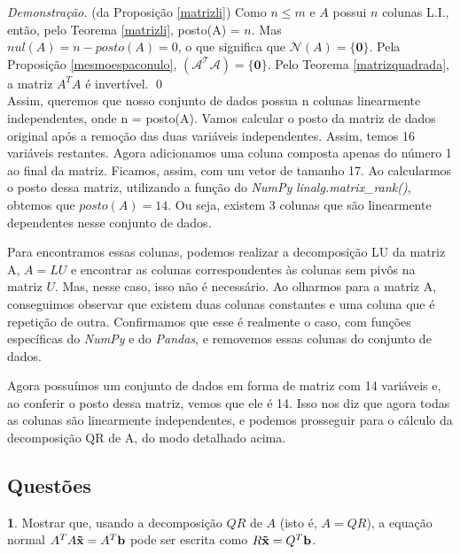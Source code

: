 \documentclass[a4paper, 12pt]{article}
\theoremstyle{definition}
\newtheorem{questao}{}
\newenvironment{demonstracao}{\noindent\textit{Demonstração.}}{\qed}
\theoremstyle{remark}
\begin{document}
\begin{demonstracao}{ (da Proposição \ref{matrizli})}
Como $n \leq m$ e $A$ possui $n$ colunas L.I., então, pelo Teorema \ref{matrizli}, posto(A) = $n$. Mas $nul(A) = n - posto(A) = 0$, o que significa que $\mathcal{N}(A) = \{\mathbf{0}\}$. Pela Proposição \ref{mesmoespaconulo}, $\mathcal{(A^TA)} = \{\mathbf{0}\}$. Pelo Teorema \ref{matrizquadrada}, a matriz $A^TA$ é invertível.
\end{demonstracao}\\

Assim, queremos que nosso conjunto de dados possua n colunas linearmente independentes, onde n = posto(A). Vamos calcular o posto da matriz de dados original após a remoção das duas variáveis independentes. Assim, temos 16 variáveis restantes. Agora adicionamos uma coluna composta apenas do número 1 ao final da matriz. Ficamos, assim, com um vetor de tamanho 17. Ao calcularmos o posto dessa matriz, utilizando a função do \textit{NumPy} \textit{linalg.matrix\_rank()}, obtemos que $posto(A) = 14$. Ou seja, existem 3 colunas que são linearmente dependentes nesse conjunto de dados.

Para encontramos essas colunas, podemos realizar a decomposição LU da matriz A, $A = LU$ e encontrar as colunas correspondentes às colunas sem pivôs na matriz $U$. Mas, nesse caso, isso não é necessário. Ao olharmos para a matriz A, conseguimos observar que existem duas colunas constantes e uma coluna que é repetição de outra. Confirmamos que esse é realmente o caso, com funções específicas do \textit{NumPy} e do \textit{Pandas}, e removemos essas colunas do conjunto de dados.

Agora possuímos um conjunto de dados em forma de matriz com 14 variáveis e, ao conferir o posto dessa matriz, vemos que ele é 14. Isso nos diz que agora todas as colunas são linearmente independentes, e podemos prosseguir para o cálculo da decomposição QR de A, do modo detalhado acima.

\subsection{Questões}

\begin{questao}
    Mostrar que, usando a decomposição $QR$ de $A$ (isto é, $A = QR$), a equação normal $A^TA\mathbf{\Tilde{x}} = A^T\mathbf{b}$ pode ser escrita como $R\mathbf{\Tilde{x}} = Q^T\mathbf{b}$.
\end{questao}
\end{document}
